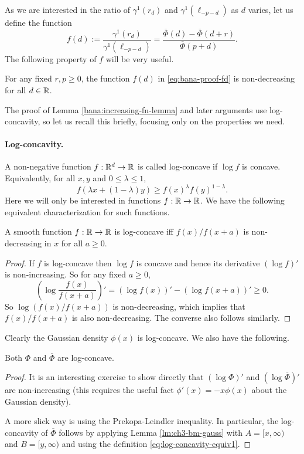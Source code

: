 As we are interested in the ratio of $\gamma^1(r_d)$ and $\gamma^1(\ell_{-p-d})$ as $d$ varies, let us define the function
\begin{equation}
\label{eq:bana-proof-fd}
     f(d) := \frac{\gamma^1(r_d)}{\gamma^1(\ell_{-p-d})} = \frac{\overline{\Phi}(d)-\overline{\Phi}(d+r)} {\overline{\Phi}(p+d)}.
\end{equation} 
The following property of $f$ will be very useful.

\begin{lemma}
    \label{bana:increasing-fn-lemma}
   For any fixed $r,p \geq 0$, the function $f(d)$ in \eqref{eq:bana-proof-fd} is non-decreasing for all $d\in \mathbb{R}$.
\end{lemma}
The proof of Lemma \ref{bana:increasing-fn-lemma} and later arguments use log-concavity, so let us recall this briefly, focusing only on the properties we need.
\paragraph{Log-concavity.} A non-negative function $f:\mathbb{R}^d \rightarrow \mathbb{R}$ is called log-concave if $\log f$ is concave.
Equivalently, for all $x,y$  and $0 \leq \lambda \leq  1$,
\begin{equation}
    \label{eq:log-concavity-equiv1}
    f(\lambda x + (1-\lambda) y) \geq f(x)^\lambda f(y)^{1-\lambda}.
\end{equation}  
Here we will only be interested in functions $f:\mathbb{R} \rightarrow \mathbb{R}$. We have the following equivalent characterization for such functions.
\begin{proposition}
\label{prop:log-conc-non-decreasing}
A smooth function $f:\mathbb{R}\rightarrow \mathbb{R}$ is log-concave iff $f(x)/f(x+a)$ is non-decreasing in $x$ for all $a\geq 0$.  
\end{proposition}
\begin{proof}
If $f$ is log-concave then $\log f$ is concave and hence its derivative $(\log f)'$ is non-increasing. So for any fixed $a\geq 0$,
\[ \left(\log \frac{f(x)}{f(x+a)}\right)' =  (\log f(x))' - (\log f(x+a))' \geq 0.\]
So $\log (f(x)/f(x+a))$ is non-decreasing, which implies that $f(x)/f(x+a)$ is also non-decreasing. The converse also follows similarly.
\end{proof}
Clearly the Gaussian density $\phi(x)$ is log-concave. We also have the following.
\begin{proposition}
    Both $\Phi$ and $\overline{\Phi}$ are log-concave.
\end{proposition}
\begin{proof}
It is an interesting exercise to show directly that $(\log \Phi)'$ 
and $(\log \overline \Phi)'$ are non-increasing
(this requires the useful fact $\phi'(x) = -x \phi(x)$ about the Gaussian density).

A more slick way is using the Prekopa-Leindler inequality. In particular, the log-concavity of $\overline{\Phi}$ follows by applying Lemma \ref{lm:ch3-bm-gauss} with $A = [x,\infty)$ and $B = [y,\infty)$ and using the definition \eqref{eq:log-concavity-equiv1}. 
\end{proof}

